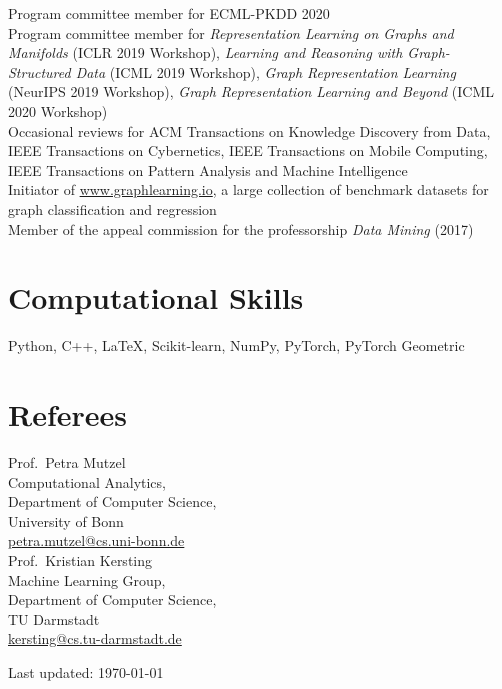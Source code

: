 \documentclass[11pt, a4paper]{scrartcl}
\begin{document}
Program committee member for ECML-PKDD 2020\\

Program committee member for \emph{Representation Learning on Graphs and Manifolds} (ICLR 2019 Workshop), \emph{Learning and Reasoning with Graph-Structured Data} (ICML 2019 Workshop), \emph{Graph Representation Learning} (NeurIPS 2019 Workshop), \emph{Graph Representation Learning and Beyond} (ICML 2020 Workshop)\\

Occasional reviews for ACM Transactions on Knowledge Discovery from Data, IEEE Transactions on Cybernetics, IEEE Transactions on Mobile Computing, IEEE Transactions on Pattern Analysis and Machine Intelligence\\




Initiator of \url{www.graphlearning.io}, a large collection of benchmark datasets for graph classification and regression\\

Member of the appeal commission for the professorship \emph{Data Mining} (2017)

\section*{Computational Skills}
Python, C++, \LaTeX, Scikit-learn, NumPy, PyTorch, PyTorch Geometric

\section*{Referees}
Prof.~Petra Mutzel\\
Computational Analytics,\\ 
Department of Computer Science,\\
University of Bonn \\
\href{mailto:petra.mutzel@cs.uni-bonn.de}{petra.mutzel@cs.uni-bonn.de}\\


Prof.~Kristian Kersting\\ 
Machine Learning Group,\\
Department of Computer Science,\\
TU Darmstadt\\
\href{mailto:kersting@cs.tu-darmstadt.de}{kersting@cs.tu-darmstadt.de}\\

\vfill{} 
\begin{center}
{\scriptsize Last updated: \today}
\end{center}
\end{document}
